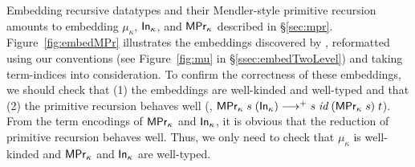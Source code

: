 Embedding recursive datatypes and their Mendler-style primitive recursion
amounts to embedding $\mu_\kappa$, $\mathsf{In}_\kappa$, and $\mathsf{MPr}_\kappa$ described
in \S\ref{sec:mpr}. Figure~\ref{fig:embedMPr} illustrates the embeddings
discovered by \citet{AbeMat04}, reformatted using our conventions (see
Figure~\ref{fig:mu} in \S\ref{ssec:embedTwoLevel}) and taking term-indices
into consideration. To confirm the correctness of these embeddings,
we should check that (1) the embeddings are well-kinded and well-typed
and that (2) the primitive recursion behaves well
(\ie, $\mathsf{MPr}_\kappa\;s\;(\mathsf{In}_\kappa) -->+ s\;\textit{id}\;(\mathsf{MPr}_\kappa\;s)\;t$).
From the term encodings of $\mathsf{MPr}_\kappa$ and $\mathsf{In}_\kappa$, it is obvious that
the reduction of primitive recursion behaves well. Thus, we only need to check
that $\mu_\kappa$ is well-kinded and $\mathsf{MPr}_\kappa$ and $\mathsf{In}_\kappa$ are
well-typed.
